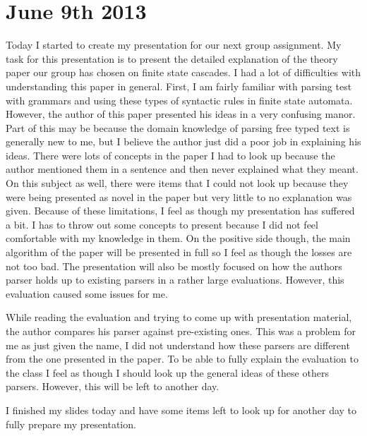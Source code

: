 \documentclass[conference]{IEEEtran}
\begin{document}
\section{June 9th 2013}
Today I started to create my presentation for our next group assignment. My task for
this presentation is to present the detailed explanation of the theory paper our group has
chosen on finite state cascades. I had a lot of difficulties with understanding this paper
in general. First, I am fairly familiar with parsing test with grammars and using these 
types of syntactic rules in finite state automata. However, the author of this paper presented
his ideas in a very confusing manor. Part of this may be because the domain knowledge of
parsing free typed text is generally new to me, but I believe the author just did a poor job
in explaining his ideas. There were lots of concepts in the paper I had to look up because
the author mentioned them in a sentence and then never explained what they meant. On this subject
as well, there were items that I could not look up because they were being presented as novel 
in the paper but very little to no explanation was given. Because of these limitations, I feel
as though my presentation has suffered a bit. I has to throw out some concepts to present because
I did not feel comfortable with my knowledge in them. On the positive side though, the main algorithm
of the paper will be presented in full so I feel as though the losses are not too bad. The 
presentation will also be mostly focused on how the authors parser holds up to existing parsers
in a rather large evaluations. However, this evaluation caused some issues for me.

While reading the evaluation and trying to come up with presentation material, the author compares
his parser against pre-existing ones. This was a problem for me as just given the name, I did 
not understand how these parsers are different from the one presented in the paper. To be able
to fully explain the evaluation to the class I feel as though I should look up the general
ideas of these others parsers. However, this will be left to another day.

I finished my slides today and have some items left to look up for another day to fully prepare
my presentation.
\end{document}
